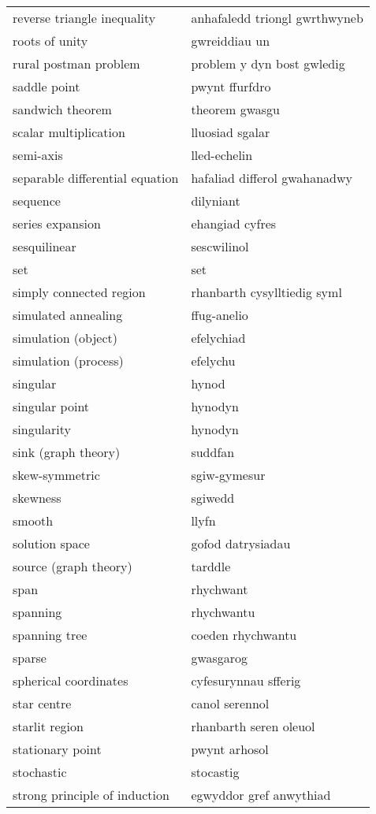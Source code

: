 \begin{supertabular}{p{0.22\textwidth}p{0.22\textwidth}}
reverse triangle inequality & anhafaledd triongl gwrthwyneb \\
roots of unity & gwreiddiau un \\
rural postman problem & problem y dyn bost gwledig \\
saddle point & pwynt ffurfdro \\
sandwich theorem & theorem gwasgu \\
scalar multiplication & lluosiad sgalar \\
semi-axis & lled-echelin \\
separable differential equation & hafaliad differol gwahanadwy \\
sequence & dilyniant \\
series expansion & ehangiad cyfres \\
sesquilinear & sescwilinol \\
set & set \\
simply connected region & rhanbarth cysylltiedig syml \\
simulated annealing & ffug-anelio \\
simulation (object) & efelychiad \\
simulation (process) & efelychu \\
singular & hynod \\
singular point & hynodyn \\
singularity & hynodyn \\
sink (graph theory) & suddfan \\
skew-symmetric & sgiw-gymesur \\
skewness & sgiwedd \\
smooth & llyfn \\
solution space & gofod datrysiadau \\
source (graph theory) & tarddle \\
span & rhychwant \\
spanning & rhychwantu \\
spanning tree & coeden rhychwantu \\
sparse & gwasgarog \\
spherical coordinates & cyfesurynnau sfferig \\
star centre & canol serennol \\
starlit region & rhanbarth seren oleuol \\
stationary point & pwynt arhosol \\
stochastic & stocastig \\
strong principle of induction & egwyddor gref anwythiad \\

\end{supertabular}
